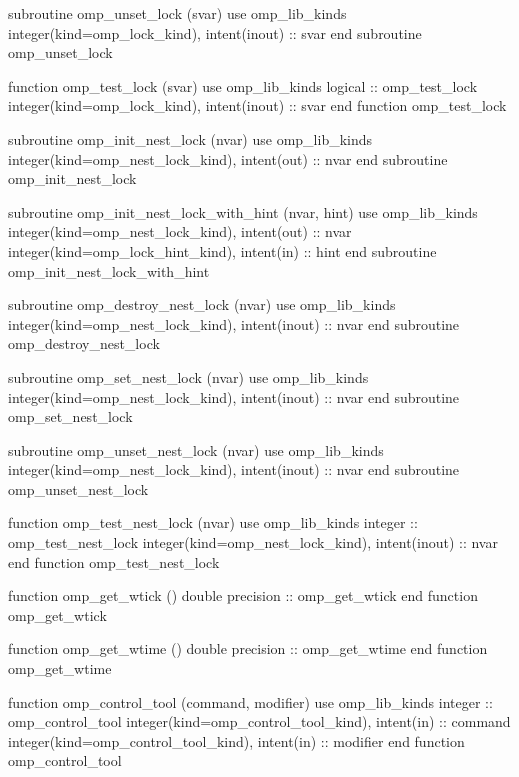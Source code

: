 {{\begin{codepar}
          subroutine omp\_unset\_lock (svar)
           use omp\_lib\_kinds
           integer(kind=omp\_lock\_kind), intent(inout) :: svar
          end subroutine omp\_unset\_lock

          function omp\_test\_lock (svar)
           use omp\_lib\_kinds
           logical :: omp\_test\_lock
           integer(kind=omp\_lock\_kind), intent(inout) :: svar
          end function omp\_test\_lock

          subroutine omp\_init\_nest\_lock (nvar)
           use omp\_lib\_kinds
           integer(kind=omp\_nest\_lock\_kind), intent(out) :: nvar
          end subroutine omp\_init\_nest\_lock

          subroutine omp\_init\_nest\_lock\_with\_hint (nvar, hint)
           use omp\_lib\_kinds
           integer(kind=omp\_nest\_lock\_kind), intent(out) :: nvar
           integer(kind=omp\_lock\_hint\_kind), intent(in) :: hint
          end subroutine omp\_init\_nest\_lock\_with\_hint

          subroutine omp\_destroy\_nest\_lock (nvar)
           use omp\_lib\_kinds
           integer(kind=omp\_nest\_lock\_kind), intent(inout) :: nvar
          end subroutine omp\_destroy\_nest\_lock

          subroutine omp\_set\_nest\_lock (nvar)
           use omp\_lib\_kinds
           integer(kind=omp\_nest\_lock\_kind), intent(inout) :: nvar
          end subroutine omp\_set\_nest\_lock

          subroutine omp\_unset\_nest\_lock (nvar)
           use omp\_lib\_kinds
           integer(kind=omp\_nest\_lock\_kind), intent(inout) :: nvar
          end subroutine omp\_unset\_nest\_lock

          function omp\_test\_nest\_lock (nvar)
           use omp\_lib\_kinds
           integer :: omp\_test\_nest\_lock
           integer(kind=omp\_nest\_lock\_kind), intent(inout) :: nvar
          end function omp\_test\_nest\_lock

          function omp\_get\_wtick ()
           double precision :: omp\_get\_wtick
          end function omp\_get\_wtick

          function omp\_get\_wtime ()
           double precision :: omp\_get\_wtime
          end function omp\_get\_wtime
\begin{samepage}
          function omp\_control\_tool (command, modifier)
           use omp\_lib\_kinds
           integer :: omp\_control\_tool 
           integer(kind=omp\_control\_tool\_kind), intent(in) :: command
           integer(kind=omp\_control\_tool\_kind), intent(in) :: modifier
          end function omp\_control\_tool
\end{samepage}


\end{codepar}}}
